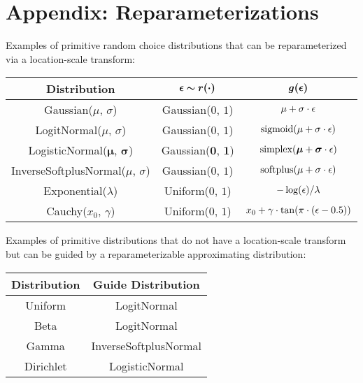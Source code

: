 \section{Appendix: Reparameterizations}
\label{sec:appendix_reparam}

Examples of primitive random choice distributions that can be reparameterized via a location-scale transform:

\begin{center}
\renewcommand{\arraystretch}{1.5}
\begin{tabular}{c | c | c}
\textbf{Distribution} & $\bm{\epsilon \sim r(\cdot)}$ & $\bm{g(\epsilon)}$ \\
\hline
Gaussian($\mu$, $\sigma$) & Gaussian($0$, $1$) & $\mu + \sigma \cdot \epsilon$ \\
LogitNormal($\mu$, $\sigma$) & Gaussian($0$, $1$) & $\text{sigmoid}(\mu + \sigma \cdot \epsilon)$ \\
LogisticNormal($\bm{\mu}$, $\bm{\sigma}$) & Gaussian($\bm{0}$, $\bm{1}$) & $\text{simplex}(\bm{\mu} + \bm{\sigma} \cdot \epsilon)$ \\
InverseSoftplusNormal($\mu$, $\sigma$) & Gaussian($0$, $1$) & $\text{softplus}(\mu + \sigma \cdot \epsilon)$ \\
Exponential($\lambda$) & Uniform($0$, $1$) & $-\log(\epsilon) / \lambda$ \\
Cauchy($x_0$, $\gamma$) & Uniform($0$, $1$) & $x_0 + \gamma \cdot \tan( \pi \cdot (\epsilon - 0.5) )$
\end{tabular}
\end{center}

Examples of primitive distributions that do not have a location-scale transform but can be guided by a reparameterizable approximating distribution:

\begin{center}
\renewcommand{\arraystretch}{1.5}
\begin{tabular}{c | c}
\textbf{Distribution} & \textbf{Guide Distribution} \\
\hline
Uniform & LogitNormal \\
Beta & LogitNormal \\
Gamma & InverseSoftplusNormal \\
Dirichlet & LogisticNormal
\end{tabular}
\end{center}
